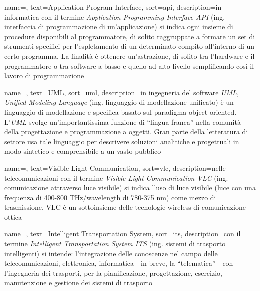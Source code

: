 

 {
    name=,
    text=Application Program Interface,
    sort=api,
    description={in informatica con il termine \emph{Application Programming Interface API} (ing. interfaccia di programmazione di un'applicazione) si indica ogni insieme di procedure disponibili al programmatore, di solito raggruppate a formare un set di strumenti specifici per l'espletamento di un determinato compito all'interno di un certo programma. La finalità è ottenere un'astrazione, di solito tra l'hardware e il programmatore o tra software a basso e quello ad alto livello semplificando così il lavoro di programmazione}
}

 {
    name=,
    text=UML,
    sort=uml,
    description={in ingegneria del software \emph{UML, Unified Modeling Language} (ing. linguaggio di modellazione unificato) è un linguaggio di modellazione e specifica basato sul paradigma object-oriented. L'\emph{UML} svolge un'importantissima funzione di ``lingua franca'' nella comunità della progettazione e programmazione a oggetti. Gran parte della letteratura di settore usa tale linguaggio per descrivere soluzioni analitiche e progettuali in modo sintetico e comprensibile a un vasto pubblico}
}

 {
    name=,
    text=Visible Light Communication,
    sort=vlc,
    description={nelle telecomunicazioni con il termine \emph{Visible Light Communication VLC} (ing. comunicazione attraverso luce visibile) si indica l'uso di luce visibile (luce con una frequenza di 400-800 THz/wavelength di 780-375 nm) come mezzo di trasmissione. VLC è un sottoinsieme delle tecnologie wireless di comunicazione ottica}
}

 {
    name=,
    text=Intelligent Transportation System,
    sort=its,
    description={con il termine \emph{Intelligent Transportation System ITS} (ing. sistemi di trasporto intelligenti) si intende: l'integrazione delle conoscenze nel campo delle telecomunicazioni, elettronica, informatica - in breve, la “telematica” - con l'ingegneria dei trasporti, per la pianificazione, progettazione, esercizio, manutenzione e gestione dei sistemi di trasporto}
}

